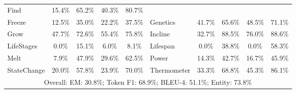 \begin{table}[h]
\begin{tabular}{lcccc|lcccc}
Find               &    15.4\%&      65.2\%&    40.3\%&      80.7\%\\
Freeze              &    12.5\%&      35.0\%&    22.2\%&      37.5\%&
Genetics          &    41.7\%&      65.6\%&    48.5\%&      71.1\%\\
Grow               &    47.7\%&      72.6\%&    55.4\%&      75.8\%&
Incline           &    32.7\%&      88.5\%&    76.0\%&      88.6\%\\
LifeStages          &     0.0\%&      15.1\%&     6.0\%&       8.1\%&
Lifespan            &     0.0\%&      38.8\%&     0.0\%&      58.3\%\\
Melt               &     7.9\%&      47.9\%&    29.6\%&      62.5\%&
Power               &    14.3\%&      42.7\%&    16.7\%&      45.9\%\\
StateChange         &    20.0\%&      57.8\%&    23.9\%&      70.0\%&
Thermometer         &    33.3\%&      68.8\%&    45.3\%&      86.1\%\\
\midrule
\multicolumn{10}{c}{Overall: EM: 30.8\%; Token F1: 68.9\%; BLEU-4: 51.1\%; Entity: 73.8\%}\\
\bottomrule
\end{tabular}
\end{table}